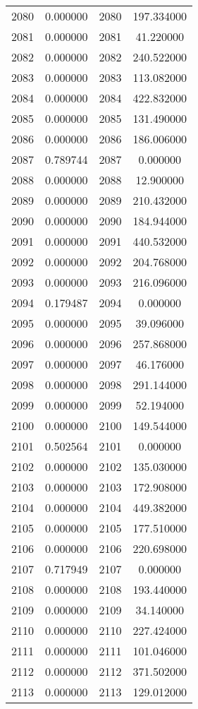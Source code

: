 \documentclass[12pt]{article}
\begin{document}
\begin{longtable}{@{}cccc@{}}
2080 & 0.000000 & 2080 & 197.334000 \\
2081 & 0.000000 & 2081 & 41.220000 \\
2082 & 0.000000 & 2082 & 240.522000 \\
2083 & 0.000000 & 2083 & 113.082000 \\
2084 & 0.000000 & 2084 & 422.832000 \\
2085 & 0.000000 & 2085 & 131.490000 \\
2086 & 0.000000 & 2086 & 186.006000 \\
2087 & 0.789744 & 2087 & 0.000000 \\
2088 & 0.000000 & 2088 & 12.900000 \\
2089 & 0.000000 & 2089 & 210.432000 \\
2090 & 0.000000 & 2090 & 184.944000 \\
2091 & 0.000000 & 2091 & 440.532000 \\
2092 & 0.000000 & 2092 & 204.768000 \\
2093 & 0.000000 & 2093 & 216.096000 \\
2094 & 0.179487 & 2094 & 0.000000 \\
2095 & 0.000000 & 2095 & 39.096000 \\
2096 & 0.000000 & 2096 & 257.868000 \\
2097 & 0.000000 & 2097 & 46.176000 \\
2098 & 0.000000 & 2098 & 291.144000 \\
2099 & 0.000000 & 2099 & 52.194000 \\
2100 & 0.000000 & 2100 & 149.544000 \\
2101 & 0.502564 & 2101 & 0.000000 \\
2102 & 0.000000 & 2102 & 135.030000 \\
2103 & 0.000000 & 2103 & 172.908000 \\
2104 & 0.000000 & 2104 & 449.382000 \\
2105 & 0.000000 & 2105 & 177.510000 \\
2106 & 0.000000 & 2106 & 220.698000 \\
2107 & 0.717949 & 2107 & 0.000000 \\
2108 & 0.000000 & 2108 & 193.440000 \\
2109 & 0.000000 & 2109 & 34.140000 \\
2110 & 0.000000 & 2110 & 227.424000 \\
2111 & 0.000000 & 2111 & 101.046000 \\
2112 & 0.000000 & 2112 & 371.502000 \\
2113 & 0.000000 & 2113 & 129.012000 \\

\end{longtable}
\end{document}
